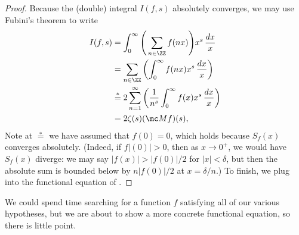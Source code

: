 \documentclass[../notes.tex]{subfiles}
\begin{document}
\begin{proof}
	Because the (double) integral $I(f,s)$ absolutely converges, we may use Fubini's theorem to write
	\begin{align*}
		I(f,s) &= \int_0^\infty\Bigg(\sum_{n\in\ZZ}f(nx)\Bigg)x^s\,\frac{dx}x \\
		&= \sum_{n\in\ZZ}\left(\int_0^\infty f(nx)x^s\,\frac{dx}x\right) \\
		&\stackrel*= 2\sum_{n=1}^\infty\left(\frac1{n^s}\int_0^\infty f(x)x^s\,\frac{dx}x\right) \\
		&= 2\zeta(s)(\mc Mf)(s),
	\end{align*}
	Note at $\stackrel*=$ we have assumed that $f(0)=0$, which holds because $S_f(x)$ converges absolutely. (Indeed, if $f|(0)|>0$, then as $x\to0^+$, we would have $S_f(x)$ diverge: we may say $|f(x)|>|f(0)|/2$ for $|x|<\delta$, but then the absolute sum is bounded below by $n|f(0)|/2$ at $x=\delta/n$.) To finish, we plug into the functional equation of .
\end{proof}
\begin{remark}
	We could spend time searching for a function $f$ satisfying all of our various hypotheses, but we are about to show a more concrete functional equation, so there is little point.
\end{remark}
\end{document}
